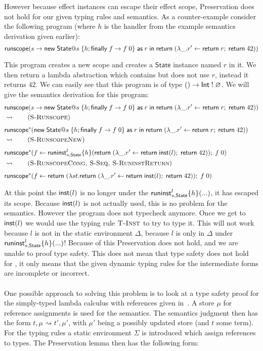 {However because effect instances can escape their effect scope, Preservation does not hold for our given typing rules and semantics.
As a counter-example consider the following program (where $h$ is the handler from the example semantics derivation given earlier):
\[ \mathsf{runscope} ( s \rightarrow \mathsf{new} \; \mathsf{State} @ s \; \{ h ; \mathsf{finally} \; f \rightarrow f \; 0 \} \; \mathsf{as} \; r \;\mathsf{in}\; \mathsf{return} \; (\lambda \_ . r' \leftarrow \mathsf{return} \; r ;\; \mathsf{return} \; 42) ) \]

This program creates a new scope and creates a $\mathsf{State}$ instance named $r$ in it.
We then return a lambda abstraction which contains but does not use $r$, instead it returns $42$.
We can easily see that this program is of type $() \rightarrow \mathsf{Int} \; ! \; \varnothing$.
We will give the semantics derivation for this program:
\newpage
\begin{align*}
&\chandlen{s}{\cnew{\mathsf{State}}{s}{\handler ; \hfinally{f}{\capp{f}{0}}}{r}{\creturn{(\vabs{\_}{\cdo{r'}{\creturn{r}}{\creturn{42}}})}}} \\
& \opsem{} \tag{\textsc{S-Runscope}} \\
&\chandlec{s}{\cnew{\mathsf{State}}{s}{\handler ; \hfinally{f}{\capp{f}{0}}}{r}{\creturn{(\vabs{\_}{\cdo{r'}{\creturn{r}}{\creturn{42}}})}}} \\
& \opsem{} \tag{\textsc{S-RunscopeNew}} \\
& \chandlec{s}{\cdo{f}{\chandlei{l}{s,\mathsf{State}}{h}{
		\creturn{(\vabs{\_}{\cdo{r'}{\creturn{\vinst{l}}}{\creturn{42}}})}}}{\capp{f}{0}}} \\
& \opsem{} \tag{\textsc{S-RunscopeCong, S-Seq, S-RuninstReturn}} \\
& \chandlec{s}{\cdo{f}{\creturn{(\vabs{st}{\creturn{(\vabs{\_}{\cdo{r'}{\creturn{\vinst{l}}}{\creturn{42}}})}})}}{\capp{f}{0}}} \\
\end{align*}

At this point the $\mathsf{inst}(l)$ is no longer under the $\mathsf{runinst}^{l}_{s,\mathsf{State}} \{ h \} ( ... )$, it has escaped its scope.
Because $\mathsf{inst}(l)$ is not actually used, this is no problem for the semantics.
However the program does not typecheck anymore.
Once we get to $\mathsf{inst}(l)$ we would use the typing rule $\textsc{T-Inst}$ to try to type it.
This will not work because $l$ is not in the static environment $\Delta$, because $l$ is only in $\Delta$ under $\mathsf{runinst}^{l}_{s,\mathsf{State}} \{ h \} ( ... )$!
Because of this Preservation does not hold, and we are unable to proof type safety.
This does not mean that type safety does not hold for \lang{}, it only means that the given dynamic typing rules for the intermediate forms are incomplete or incorrect.
\\\\
One possible approach to solving this problem is to look at a type safety proof for the simply-typed lambda calculus with references given in~\autocite{tapl}.
A store $\mu$ for reference assignments is used for the semantics.
The semantics judgment then has the form $t, \mu \rightsquigarrow t', \mu'$, with $\mu'$ being a possibly updated store (and $t$ some term).
For the typing rules a static environment $\Sigma$ is introduced which assign references to types.
The Preservation lemma then has the following form:
 
}
